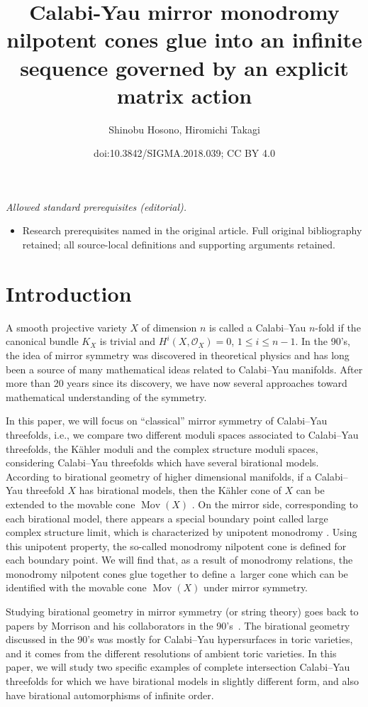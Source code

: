 \documentclass[10pt,a4paper]{amsart}
\title{Calabi-Yau mirror monodromy nilpotent cones glue into an infinite sequence governed by an explicit matrix action}
\author{Shinobu Hosono, Hiromichi Takagi}
\date{doi:10.3842/SIGMA.2018.039; CC BY 4.0}
\numberwithin{equation}{section}
\begin{document}
\maketitle
\noindent\textit{Allowed standard prerequisites (editorial).}\begin{itemize}
\item Research prerequisites named in the original article. Full original bibliography retained; all source-local definitions and supporting arguments retained.
\end{itemize}\medskip
\section{Introduction}

A smooth projective variety $X$ of dimension $n$ is called a Calabi--Yau $n$-fold if the canonical bundle $K_{X}$ is trivial and $H^{i}(X,\mathcal{O}_{X})=0$, $1\leq i\leq n-1$. In the 90's, the idea of mirror symmetry was discovered in theoretical physics and has long been a source of many mathematical ideas related to Calabi--Yau manifolds. After more than 20 years since its discovery, we have now several approaches \cite{GS1,GS2, Ko,SYZ} toward mathematical understanding of the symmetry.

In this paper, we will focus on ``classical'' mirror symmetry of Calabi--Yau threefolds, i.e., we compare two different moduli spaces associated to Calabi--Yau threefolds, the K\"ahler moduli and the complex structure moduli spaces, considering Calabi--Yau threefolds which have several birational models. According to birational geometry of higher dimensional manifolds, if a Calabi--Yau threefold $X$ has birational models, then the K\"ahler cone of $X$ can be extended to the movable cone $\operatorname{Mov}(X)$ \cite{KawCone, MoKahler}. On the mirror side, corresponding to each birational model, there appears a special boundary point called large complex structure limit, which is characterized by unipotent monodromy \cite{MoLCSL}. Using this unipotent property, the so-called monodromy nilpotent cone is defined for each boundary point. We will find that, as a result of monodromy relations, the monodromy nilpotent cones glue together to define a~larger cone which can be identified with the movable cone $\operatorname{Mov}(X)$ under mirror symmetry.

Studying birational geometry in mirror symmetry (or string theory) goes back to papers by Morrison and his collaborators in the 90's~\cite{AGM}. The birational geometry discussed in the 90's was mostly for Calabi--Yau hypersurfaces in toric varieties, and it comes from the different resolutions of ambient toric varieties. In this paper, we will study two specific examples of complete intersection Calabi--Yau threefolds for which we have birational models in slightly different form, and also have birational automorphisms of infinite order.
\end{document}
